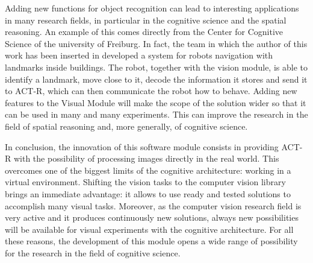 	Adding new functions for object recognition can lead to interesting applications in many research fields, in particular in the cognitive science and the spatial reasoning. 
	An example of this comes directly from the Center for Cognitive Science of the university of Freiburg.
	In fact, the team in which the author of this work has been inserted in developed a system for robots navigation with landmarks inside buildings. 
	The robot, together with the vision module, is able to identify a landmark, move close to it, decode the information it stores and send it to \mbox{ACT-R}, which can then communicate the robot how to behave.
	Adding new features to the Visual Module will make the scope of the solution wider so that it can be used in many and many experiments.
	This can improve the research in the field of spatial reasoning and, more generally, of cognitive science.


	In conclusion, the innovation of this software module consists in providing \mbox{ACT-R} with the possibility of processing images directly in the real world.
	This overcomes one of the biggest limits of the cognitive architecture: working in a virtual environment.
	Shifting the vision tasks to the computer vision library brings an immediate advantage: it allows to use ready and tested solutions to accomplish many visual tasks.
	Moreover, as the computer vision research field is very active and it produces continuously new solutions, always new possibilities will be available for visual experiments with the cognitive architecture.
	For all these reasons, the development of this module opens a wide range of possibility for the research in the field of cognitive science.





